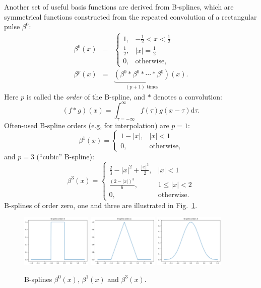 \documentclass[10pt,twoside]{book}
\begin{document}
Another set of useful basis functions are derived from B-splines, which are symmetrical functions constructed from the repeated convolution of a rectangular pulse $\beta^0$:
\begin{eqnarray*}
\beta^0( x ) 
& = &
\left\{
\begin{array}{ll}
1, & -\frac{1}{2} < x < \frac{1}{2} \\
\frac{1}{2}, & | x | = \frac{1}{2} \\
0, & \text{otherwise,}
\end{array}
\right. \\
\beta^p( x ) 
& = & 
\underbrace{
\left(
\beta^0 \ast \beta^0 \ast \cdots \ast \beta^0
\right)
}_{(p+1) \text{ times}}
(x)
.
\end{eqnarray*}
Here $p$ is called the \emph{order} of the B-spline, and 
$\ast$ denotes a convolution:
$$
\left( f \ast g \right) (x ) = \int_{\tau = -\infty}^{\infty} f( \tau ) g( x - \tau ) \mathrm{d}\tau
.
$$
Often-used B-spline orders (e.g, for interpolation) are $p=1$:
$$
\beta^1(x) 
= 
\left\{
\begin{array}{ll}
1 - |x|, & | x | < 1 \\
0, & \text{otherwise,}
\end{array}
\right.
$$
and $p=3$ (``cubic'' B-spline):
$$
\beta^3(x) 
= 
\left\{
\begin{array}{ll}
\frac{2}{3} - |x|^2 + \frac{|x|^3}{2}, & | x | < 1 \\
\frac{(2 - |x|)^3}{6}, & 1 \leq |x| < 2 \\
0, & \text{otherwise.}
\end{array}
\right.
$$
B-splines of order zero, one and three are illustrated in Fig.~\ref{fig:Bsplines}.

\begin{figure}
  \centering
  \includegraphics[width=0.3\textwidth]{BSpline_order0}
  \hfill
  \includegraphics[width=0.3\textwidth]{BSpline_order1}
  \hfill
  \includegraphics[width=0.3\textwidth]{BSpline_order3}
  \caption{B-splines $\beta^0( x )$, $\beta^1( x )$ and $\beta^3( x )$.}
  \label{fig:Bsplines}
\end{figure}
\end{document}
